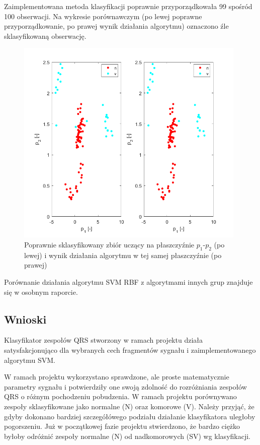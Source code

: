 \documentclass[[10pt,a4paper]{article}
\begin{document}
Zaimplementowana metoda klasyfikacji poprawnie przyporządkowała 99 spośród 100 obserwacji. Na wykresie porównawczym (po lewej poprawne przyporządkowanie, po prawej wynik działania algorytmu) oznaczono źle sklasyfikowaną obserwację.

\begin{figure}[H]
	\begin{center}
		\includegraphics[width=11cm]{testwynik.png}
		\caption{Poprawnie sklasyfikowany zbiór uczący na płaszczyźnie $p_1$-$p_2$ (po lewej) i wynik działania algorytmu w tej samej płaszczyźnie (po prawej)}
	\end{center}
\end{figure}

Porównanie działania algorytmu SVM RBF z algorytmami innych grup znajduje się w osobnym raporcie.

\subsection{Wnioski}

Klasyfikator zespołów QRS stworzony w ramach projektu działa satysfakcjonująco dla wybranych cech fragmentów sygnału i zaimplementowanego algorytmu SVM.

W ramach projektu wykorzystano sprawdzone, ale proste matematycznie parametry sygnału i potwierdziły one swoją zdolność do rozróżniania zespołów QRS o różnym pochodzeniu pobudzenia. W ramach projektu porównywano zespoły sklasyfikowane jako normalne (N) oraz komorowe (V). Należy przyjąć, że gdyby dokonano bardziej szczegółówego podziału działanie klasyfikatora uległoby pogorszeniu. Już w początkowej fazie projektu stwierdzono, że bardzo ciężko byłoby odróżnić zespoły normalne (N) od nadkomorowych (SV) wg klasyfikacji. \cite{survey}
\end{document}
